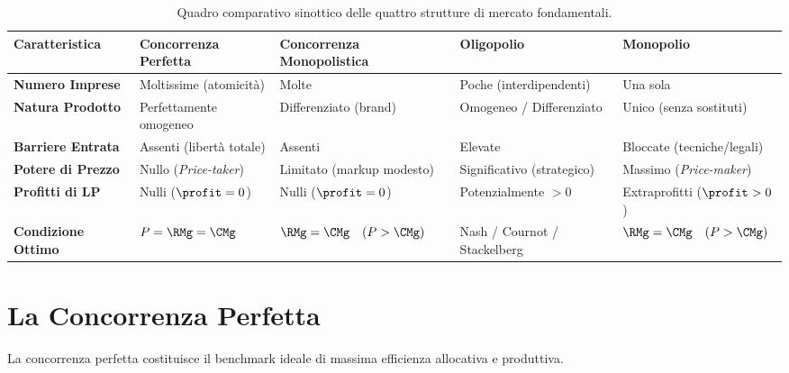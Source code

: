\begin{table}[htbp]
\centering
\small
\renewcommand{\arraystretch}{1.3}
\begin{tabularx}{\textwidth}{lXXXX}
\toprule
\textbf{Caratteristica} & \textbf{Concorrenza Perfetta} & \textbf{Concorrenza Monopolistica} & \textbf{Oligopolio} & \textbf{Monopolio} \\
\midrule
\textbf{Numero Imprese} & Moltissime (atomicità) & Molte & Poche (interdipendenti) & Una sola \\
\textbf{Natura Prodotto} & Perfettamente omogeneo & Differenziato (brand) & Omogeneo / Differenziato & Unico (senza sostituti) \\
\textbf{Barriere Entrata} & Assenti (libertà totale) & Assenti & Elevate & Bloccate (tecniche/legali) \\
\textbf{Potere di Prezzo} & Nullo (\textit{Price-taker}) & Limitato (markup modesto) & Significativo (strategico) & Massimo (\textit{Price-maker}) \\
\textbf{Profitti di LP} & Nulli ($\profit = 0$) & Nulli ($\profit = 0$) & Potenzialmente $> 0$ & Extraprofitti ($\profit > 0$) \\
\textbf{Condizione Ottimo} & $P = \RMg = \CMg$ & $\RMg = \CMg \quad (P > \CMg)$ & Nash / Cournot / Stackelberg & $\RMg = \CMg \quad (P > \CMg)$ \\
\bottomrule
\end{tabularx}
\caption{Quadro comparativo sinottico delle quattro strutture di mercato fondamentali.}
\label{tab:strutture_mercato_sinottica}
\end{table}

\section{La Concorrenza Perfetta}

La concorrenza perfetta costituisce il benchmark ideale di massima efficienza allocativa e produttiva.

